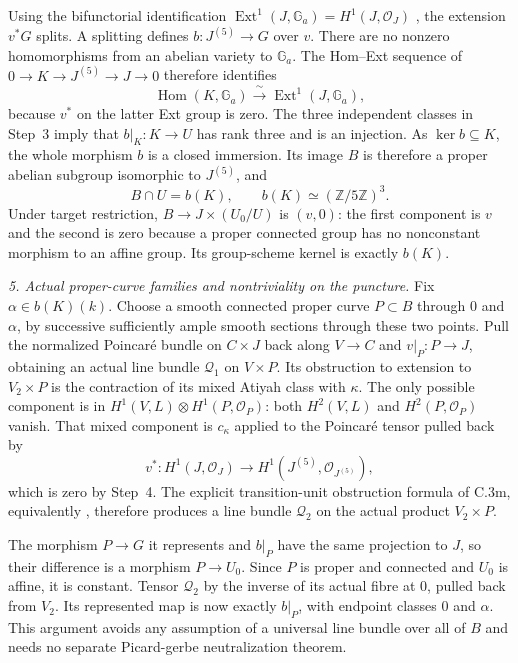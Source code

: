 Using the bifunctorial identification
$\operatorname{Ext}^1(J,\mathbb G_a)=H^1(J,\mathcal O_J)$
\citep[equation(3.8), Section3.2.3, p.~23, before the
characteristic-zero restriction]{D_BrionIsogenyII},
the extension $v^*G$ splits. A splitting defines
$b:J^{(5)}\to G$ over $v$. There are no nonzero homomorphisms from
an abelian variety to $\mathbb G_a$. The Hom--Ext sequence of
$0\to K\to J^{(5)}\to J\to0$ therefore identifies
\[
 \operatorname{Hom}(K,\mathbb G_a)
       \xrightarrow{\ \sim\ }\operatorname{Ext}^1(J,\mathbb G_a),
\]
because $v^*$ on the latter Ext group is zero. The three independent
classes in Step~3 imply that $b|_K:K\to U$ has rank three and is an
injection. As $\ker b\subseteq K$, the whole morphism $b$ is a closed
immersion. Its image $B$ is therefore a proper abelian subgroup
isomorphic to $J^{(5)}$, and
\[
 B\cap U=b(K),\qquad b(K)\simeq(\mathbb Z/5\mathbb Z)^3.
\]
Under target restriction, $B\to J\times(U_0/U)$ is $(v,0)$:
the first component is $v$ and the second is zero because a proper
connected group has no nonconstant morphism to an affine group.
Its group-scheme kernel is exactly $b(K)$.

\emph{5. Actual proper-curve families and nontriviality on the puncture.}
Fix $\alpha\in b(K)(k)$. Choose a smooth connected proper curve
$P\subset B$ through $0$ and $\alpha$, by successive sufficiently
ample smooth sections through these two points. Pull the normalized Poincaré bundle on $C\times J$ back
along $V\to C$ and $v|_P:P\to J$, obtaining an actual line bundle
$\mathcal Q_1$ on $V\times P$. Its obstruction to extension to
$V_2\times P$ is the contraction of its mixed Atiyah class with
$\kappa$. The only possible component is in
$H^1(V,L)\otimes H^1(P,\mathcal O_P)$: both $H^2(V,L)$ and
$H^2(P,\mathcal O_P)$ vanish. That mixed component is
$c_\kappa$ applied to the Poincaré tensor pulled back by
\[
 v^*:H^1(J,\mathcal O_J)\longrightarrow H^1(J^{(5)},\mathcal O_{J^{(5)}}),
\]
which is zero by Step~4. The explicit transition-unit obstruction
formula of C.3m, equivalently \citet[Theorem~2.6 and formula~(2.7.2)]{D_Illusie1972Torsors}, therefore
produces a line bundle $\mathcal Q_2$ on the actual product
$V_2\times P$.

The morphism $P\to G$ it represents and $b|_P$ have the same
projection to $J$, so their difference is a morphism $P\to U_0$.
Since $P$ is proper and connected and $U_0$ is affine, it is constant.
Tensor $\mathcal Q_2$ by the inverse of its actual fibre at $0$,
pulled back from $V_2$. Its represented map is now exactly $b|_P$,
with endpoint classes $0$ and $\alpha$. This argument avoids any
assumption of a universal line bundle over all of $B$ and needs
no separate Picard-gerbe neutralization theorem.

